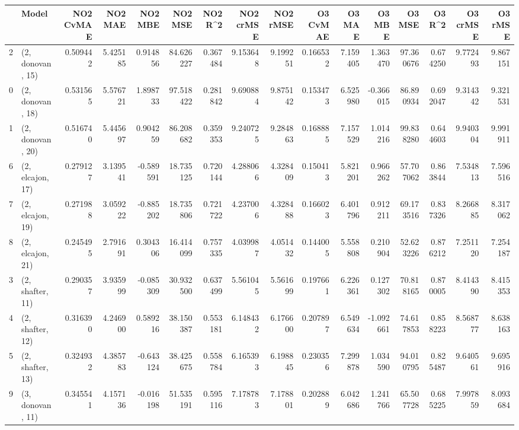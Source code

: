 \begin{tabular}{llrrrrrrrrrrrrrr}
\toprule
{} &             Model &  NO2 CvMAE &   NO2 MAE &   NO2 MBE &    NO2 MSE &   NO2 R\textasciicircum2 &  NO2 crMSE &  NO2 rMSE &  O3 CvMAE &    O3 MAE &    O3 MBE &      O3 MSE &    O3 R\textasciicircum2 &   O3 crMSE &    O3 rMSE \\
\midrule
2  &  (2, donovan, 15) &   0.509442 &  5.425185 &  0.914856 &  84.626227 &  0.367484 &   9.153648 &  9.199251 &  0.166532 &  7.159405 &  1.363470 &   97.360676 &  0.674250 &   9.772493 &   9.867151 \\
0  &  (2, donovan, 18) &   0.531565 &  5.576721 &  1.898733 &  97.518422 &  0.281842 &   9.690884 &  9.875142 &  0.153473 &  6.525980 & -0.366015 &   86.890934 &  0.692047 &   9.314342 &   9.321531 \\
1  &  (2, donovan, 20) &   0.516740 &  5.445697 &  0.904259 &  86.208682 &  0.359353 &   9.240725 &  9.284863 &  0.168885 &  7.157529 &  1.014216 &   99.838280 &  0.644603 &   9.940304 &   9.991911 \\
6  &  (2, elcajon, 17) &   0.279127 &  3.139541 & -0.589591 &  18.735125 &  0.720144 &   4.288066 &  4.328409 &  0.150413 &  5.821201 &  0.966262 &   57.707062 &  0.863844 &   7.534813 &   7.596516 \\
7  &  (2, elcajon, 19) &   0.271988 &  3.059222 & -0.885202 &  18.735806 &  0.721722 &   4.237006 &  4.328488 &  0.166023 &  6.401796 &  0.912211 &   69.173516 &  0.837326 &   8.266885 &   8.317062 \\
8  &  (2, elcajon, 21) &   0.245495 &  2.791691 &  0.304306 &  16.414099 &  0.757335 &   4.039987 &  4.051432 &  0.144005 &  5.558808 &  0.210904 &   52.623226 &  0.876212 &   7.251120 &   7.254187 \\
3  &  (2, shafter, 11) &   0.290357 &  3.935999 & -0.085309 &  30.932500 &  0.637499 &   5.561045 &  5.561699 &  0.197661 &  6.226361 &  0.127302 &   70.818165 &  0.870005 &   8.414390 &   8.415353 \\
4  &  (2, shafter, 12) &   0.316390 &  4.246900 &  0.589216 &  38.150387 &  0.553181 &   6.148432 &  6.176600 &  0.207897 &  6.549634 & -1.092661 &   74.617853 &  0.858223 &   8.568777 &   8.638163 \\
5  &  (2, shafter, 13) &   0.324932 &  4.385783 & -0.643124 &  38.425675 &  0.558784 &   6.165393 &  6.198845 &  0.230356 &  7.299878 &  1.034590 &   94.010795 &  0.825487 &   9.640561 &   9.695916 \\
9  &  (3, donovan, 11) &   0.345541 &  4.157136 & -0.016198 &  51.535191 &  0.595116 &   7.178783 &  7.178801 &  0.202889 &  6.042686 &  1.241766 &   65.507728 &  0.685225 &   7.997859 &   8.093684 \\

\end{tabular}
